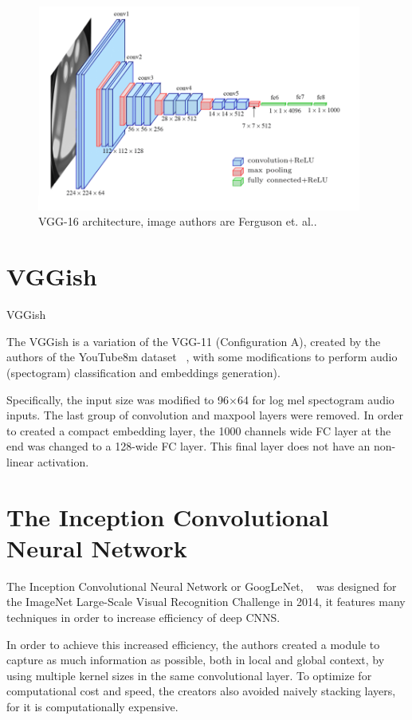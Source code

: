 \begin{figure}[!ht]
    \centering
    \includegraphics[width=0.95\textwidth]{img/vgg16.png}
    \caption{VGG-16 architecture, image authors are Ferguson et. al.\cite{ferguson2017vggimage}.}
    \label{fig:vgg16}
\end{figure}

\section{VGGish}\label{sec:VGGish}
VGGish~\cite{simonyan2014VGG}

The VGGish is a variation of the VGG-11 (Configuration A), created by the authors of the YouTube8m dataset ~\cite{abu2016youtube}, with some modifications to perform audio (spectogram) classification and embeddings generation).

Specifically, the input size was modified to 96$\times$64 for log mel spectogram audio inputs. The last group of convolution and maxpool layers were removed. In order to created a compact embedding layer, the 1000 channels wide FC layer at the end was changed to a 128-wide FC layer. This final layer does not have an non-linear activation.

\section{The Inception Convolutional Neural Network}\label{sec:Inception}

The Inception Convolutional Neural Network or GoogLeNet, ~\cite{szegedy2015Inception} was designed for the ImageNet Large-Scale Visual Recognition Challenge in 2014, it features many techniques in order to increase efficiency of deep CNNS.

In order to achieve this increased efficiency, the authors created a module to capture as much information as possible, both in local and global context, by using multiple kernel sizes in the same convolutional layer. To optimize for computational cost and speed, the creators also avoided naively stacking layers, for it is computationally expensive.

